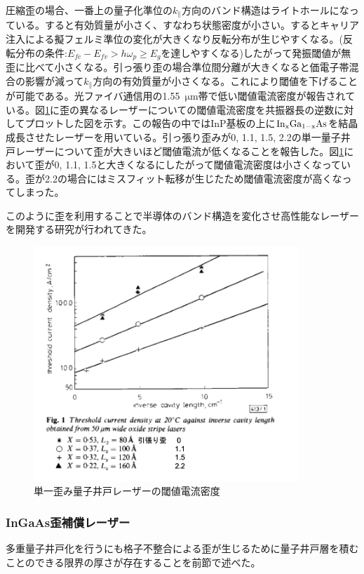 
圧縮歪の場合、一番上の量子化準位の$k_{\|}$方向のバンド構造はライトホールになっている。すると有効質量が小さく、すなわち状態密度が小さい。するとキャリア注入による擬フェルミ準位の変化が大きくなり反転分布が生じやすくなる。(反転分布の条件:$E_{fc}-E_{fv}>h\omega _{p}\geq E_{g}$を達しやすくなる)したがって発振閾値が無歪に比べて小さくなる。引っ張り歪の場合準位間分離が大きくなると価電子帯混合の影響が減って$k_{\|}$方向の有効質量が小さくなる。これにより閾値を下げることが可能である。光ファイバ通信用の1.55\ $\si{\micro\metre}$帯で低い閾値電流密度が報告されている\cite{ref_thijs}。図\ref{fig:fig_lattice_strain_Ith}に歪の異なるレーザーについての閾値電流密度を共振器長の逆数に対してプロットした図を示す。この報告の中ではInP基板の上に$\rm{In_{x}Ga_{1-x}As}$を結晶成長させたレーザーを用いている。引っ張り歪みが0, 1.1, 1.5, 2.2の単一量子井戸レーザーについて歪が大きいほど閾値電流が低くなることを報告した。図\ref{fig:fig_lattice_strain_Ith}において歪が0, 1.1, 1.5と大きくなるにしたがって閾値電流密度は小さくなっている。歪が2.2の場合にはミスフィット転移が生じたため閾値電流密度が高くなってしまった。

このように歪を利用することで半導体のバンド構造を変化させ高性能なレーザーを開発する研究が行われてきた。
\begin{figure}[h]
	\centering
	\includegraphics[width=10cm]{figure/fig_1_1_lattice_strain_Ith.png}
	\caption[単一歪み量子井戸レーザーの閾値電流密度]{単一歪み量子井戸レーザーの閾値電流密度\cite{ref_thijs}}
	\label{fig:fig_lattice_strain_Ith}
\end{figure}

\clearpage
\subsubsection{InGaAs歪補償レーザー}
多重量子井戸化を行うにも格子不整合による歪が生じるために量子井戸層を積むことのできる限界の厚さが存在することを前節で述べた。


